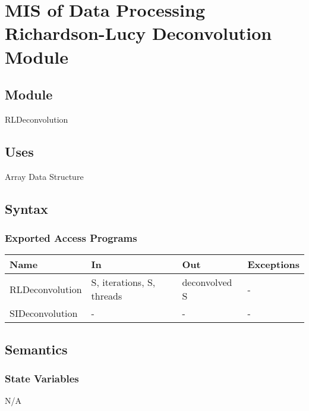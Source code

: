 \documentclass[12pt, titlepage]{article}
\begin{document}
\section{MIS of Data Processing Richardson-Lucy Deconvolution Module} \label{Mod: RLDeconvolution}

\subsection{Module}

RLDeconvolution

\subsection{Uses}
Array Data Structure

\subsection{Syntax}

\subsubsection{Exported Access Programs}

\begin{center}
\begin{tabular}{p{4cm} p{4cm} p{4cm} p{2cm}}
\hline
\textbf{Name} & \textbf{In} & \textbf{Out} & \textbf{Exceptions} \\
\hline
RLDeconvolution & S, iterations, S, threads & deconvolved S & - \\
SIDeconvolution & - & - & - \\
\hline
\end{tabular}
\end{center}

\subsection{Semantics}

\subsubsection{State Variables}
N/A
\end{document}
